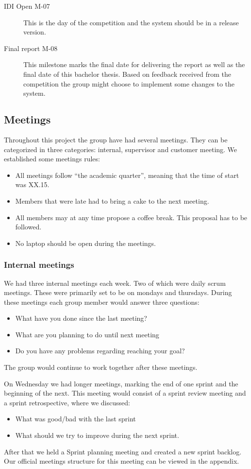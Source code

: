 \begin{description}
    \item[IDI Open M-07]
    This is the day of the competition and the system should be in a release
    version. 

    \item[Final report M-08]
    This milestone marks the final date for delivering the report as well as
    the final date of this bachelor thesis. Based on feedback received
    from the competition the group might choose to implement some changes
    to the system. 
\end{description}

\subsection{Meetings}
Throughout this project the group have had several meetings. They can be
categorized in three categories: internal, supervisor and customer
meeting. We established some meetings rules:
\begin{itemize}
    \item All meetings follow ``the academic quarter'', meaning that the time
        of start was XX.15.
    \item Members that were late had to bring a cake to the next meeting. 
    \item All members may at any time propose a coffee break. This proposal has
        to be followed. 
    \item No laptop should be open during the meetings. 
\end{itemize}
\subsubsection{Internal meetings}
We had three internal meetings each week. Two of which were daily scrum
meetings. These were primarily set to be on mondays and thursdays.
During these meetings each group member would answer three questions: 
\begin{itemize}
    \item What have you done since the last meeting?
    \item What are you planning to do until next meeting
    \item Do you have any problems regarding reaching your goal? 
\end{itemize}
The group would continue to work together after these meetings. 

On Wednesday we had longer meetings, marking the end of one sprint and
the beginning of the next. This meeting would consist of a sprint
review meeting and a sprint retrospective, where we discussed: 
\begin{itemize}
    \item What was good/bad with the last sprint
    \item What should we try to improve during the next sprint. 
\end{itemize}
After that we held a Sprint planning meeting and created a new sprint
backlog. Our official meetings structure for this meeting can be viewed
in the appendix. 

